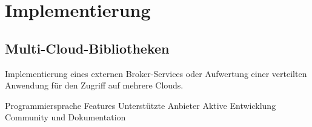 \chapter{Implementierung}

\section{Multi-Cloud-Bibliotheken}

Implementierung eines externen Broker-Services oder Aufwertung einer verteilten Anwendung für den Zugriff auf mehrere Clouds.

Programmiersprache
Features
Unterstützte Anbieter
Aktive Entwicklung
Community und Dokumentation